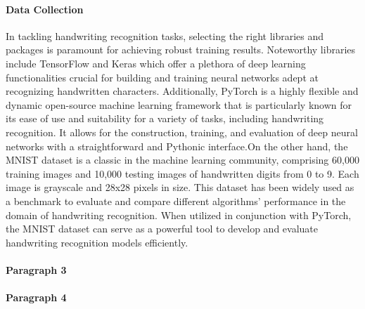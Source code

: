 \documentclass[12pt]{article}
\begin{document}
\paragraph{Data Collection}
In tackling handwriting recognition tasks, selecting the right libraries and packages is paramount for achieving robust training results. Noteworthy libraries include TensorFlow and Keras which offer a plethora of deep learning functionalities crucial for building and training neural networks adept at recognizing handwritten characters. Additionally, PyTorch is a highly flexible and dynamic open-source machine learning framework that is particularly known for its ease of use and suitability for a variety of tasks, including handwriting recognition. It allows for the construction, training, and evaluation of deep neural networks with a straightforward and Pythonic interface.On the other hand, the MNIST dataset is a classic in the machine learning community, comprising 60,000 training images and 10,000 testing images of handwritten digits from 0 to 9. Each image is grayscale and 28x28 pixels in size. This dataset has been widely used as a benchmark to evaluate and compare different algorithms' performance in the domain of handwriting recognition. When utilized in conjunction with PyTorch, the MNIST dataset can serve as a powerful tool to develop and evaluate handwriting recognition models efficiently. 
\paragraph{Paragraph 3}


\paragraph{Paragraph 4}




\cite{824821}
\cite{NIPS2008_66368270}
\cite{6981034}
\end{document}
